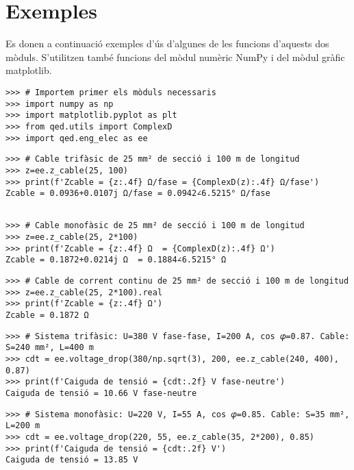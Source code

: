 


\section{Exemples}
Es donen a continuació  exemples d'ús d'algunes de les funcions d'aquests dos mòduls. S'utilitzen també funcions del mòdul numèric NumPy i del mòdul gràfic matplotlib.

\begin{lstlisting}
>>> # Importem primer els mòduls necessaris
>>> import numpy as np
>>> import matplotlib.pyplot as plt
>>> from qed.utils import ComplexD
>>> import qed.eng_elec as ee
\end{lstlisting} 


\begin{lstlisting}
>>> # Cable trifàsic de 25 mm² de secció i 100 m de longitud
>>> z=ee.z_cable(25, 100)
>>> print(f'Zcable = {z:.4f} Ω/fase = {ComplexD(z):.4f} Ω/fase')
Zcable = 0.0936+0.0107j Ω/fase = 0.0942∠6.5215° Ω/fase	
\end{lstlisting} 

\begin{lstlisting}
	
>>> # Cable monofàsic de 25 mm² de secció i 100 m de longitud
>>> z=ee.z_cable(25, 2*100)
>>> print(f'Zcable = {z:.4f} Ω  = {ComplexD(z):.4f} Ω')
Zcable = 0.1872+0.0214j Ω  = 0.1884∠6.5215° Ω	
\end{lstlisting}

\begin{lstlisting}
>>> # Cable de corrent continu de 25 mm² de secció i 100 m de longitud
>>> z=ee.z_cable(25, 2*100).real
>>> print(f'Zcable = {z:.4f} Ω')
Zcable = 0.1872 Ω	
\end{lstlisting}

\begin{lstlisting}
>>> # Sistema trifàsic: U=380 V fase-fase, I=200 A, cos 𝜑=0.87. Cable: S=240 mm², L=400 m
>>> cdt = ee.voltage_drop(380/np.sqrt(3), 200, ee.z_cable(240, 400), 0.87)
>>> print(f'Caiguda de tensió = {cdt:.2f} V fase-neutre')
Caiguda de tensió = 10.66 V fase-neutre
\end{lstlisting}

\begin{lstlisting}
>>> # Sistema monofàsic: U=220 V, I=55 A, cos 𝜑=0.85. Cable: S=35 mm², L=200 m
>>> cdt = ee.voltage_drop(220, 55, ee.z_cable(35, 2*200), 0.85)
>>> print(f'Caiguda de tensió = {cdt:.2f} V')
Caiguda de tensió = 13.85 V
\end{lstlisting}

